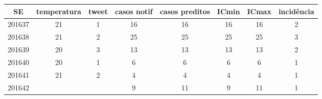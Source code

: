 \begin{tabular}{c|ccccccc}
  \hline
SE & temperatura & tweet & casos notif & casos preditos & ICmin & ICmax & incidência \\ 
  \hline
201637 & 21 & 1 & 16 & 16 & 16 & 16 & 2 \\ 
  201638 & 21 & 2 & 25 & 25 & 25 & 25 & 3 \\ 
  201639 & 20 & 3 & 13 & 13 & 13 & 13 & 2 \\ 
  201640 & 20 & 1 & 6 & 6 & 6 & 6 & 1 \\ 
  201641 & 21 & 2 & 4 & 4 & 4 & 4 & 1 \\ 
  201642 &  &  & 9 & 11 & 9 & 11 & 1 \\ 
   \hline
\end{tabular}
